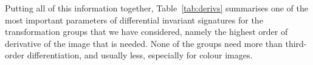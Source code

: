 \documentclass[review,onefignum,onetabnum]{siamonline190516}
\begin{document}

Putting all of this information together, Table~\ref{tab:derivs} summarises one of the most important parameters of differential invariant signatures for the transformation groups that we have considered, namely the highest order of derivative of the image that is needed. None of the groups need more than third-order differentiation, and usually less, especially for colour images. 

\end{document}
